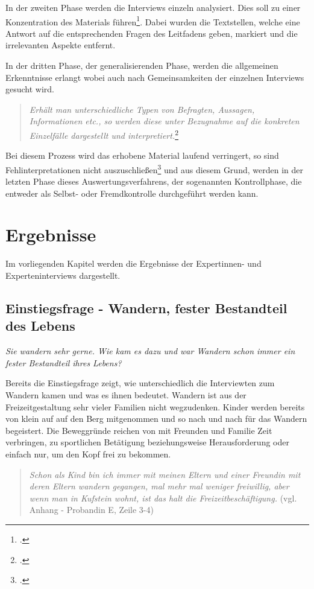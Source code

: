 In der zweiten Phase werden die Interviews einzeln analysiert. Dies soll zu einer Konzentration des Materials führen\footcite[S.368]{lamnek}. Dabei wurden die Textstellen, welche eine Antwort auf die entsprechenden Fragen des Leitfadens geben, markiert und die irrelevanten Aspekte entfernt.

In der dritten Phase, der generalisierenden Phase, werden die allgemeinen Erkenntnisse erlangt wobei auch nach Gemeinsamkeiten der einzelnen Interviews gesucht wird. 

\begin{quote}
	\textit{\glqq Erhält man unterschiedliche Typen von Befragten, Aussagen, Informationen etc., so werden diese unter Bezugnahme auf die konkreten Einzelfälle dargestellt und interpretiert.\grqq}\footcite[S. 369]{lamnek}
\end{quote}

Bei diesem Prozess wird das erhobene Material laufend verringert, so sind Fehlinterpretationen nicht auszuschließen\footcite[S. 369]{lamnek} und aus diesem Grund, werden in der letzten Phase dieses Auswertungsverfahrens, der sogenannten Kontrollphase, die entweder als Selbst- oder Fremdkontrolle durchgeführt werden kann.


\section{Ergebnisse}

Im vorliegenden Kapitel werden die Ergebnisse der Expertinnen- und Experteninterviews dargestellt. 

\subsection{Einstiegsfrage - Wandern, fester Bestandteil des Lebens}

\textit{Sie wandern sehr gerne. Wie kam es dazu und war Wandern schon immer ein fester Bestandteil ihres Lebens?}

Bereits die Einstiegsfrage zeigt, wie unterschiedlich die Interviewten zum Wandern kamen und was es ihnen bedeutet.
Wandern ist aus der Freizeitgestaltung sehr vieler Familien nicht wegzudenken. Kinder werden bereits von klein auf auf den Berg mitgenommen und so nach und nach für das Wandern begeistert. Die Beweggründe reichen von mit Freunden und Familie Zeit verbringen, zu sportlichen Betätigung beziehungsweise Herausforderung oder einfach nur, um den Kopf frei zu bekommen. 
\begin{quote}
	\textit{\glqq Schon als Kind bin ich immer mit meinen Eltern und einer Freundin mit deren Eltern wandern gegangen, mal mehr mal weniger freiwillig, aber wenn man in Kufstein wohnt, ist das halt die Freizeitbeschäftigung.\grqq} (vgl. Anhang - Probandin E, Zeile 3-4)
\end{quote}

